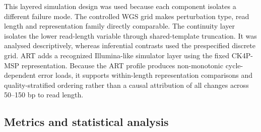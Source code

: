 This layered simulation design was used because each component isolates a different failure mode. The controlled WGS grid makes perturbation type, read length and representation family directly comparable. The continuity layer isolates the lower read-length variable through shared-template truncation. It was analysed descriptively, whereas inferential contrasts used the prespecified discrete grid. ART adds a recognized Illumina-like simulator layer using the fixed CK4P-MSP representation. Because the ART profile produces non-monotonic cycle-dependent error loads, it supports within-length representation comparisons and quality-stratified ordering rather than a causal attribution of all changes across 50--150 bp to read length.

\begin{table}[!tbp]
\centering
\scriptsize
\caption{Data layers, analysis scales, diagnostic questions, primary metrics and claim boundaries. Row counts include perturbation and task derivatives where stated and therefore are not counts of independent biological observations.}
\label{tab:table2}

\end{table}


\subsection{Metrics and statistical analysis}

